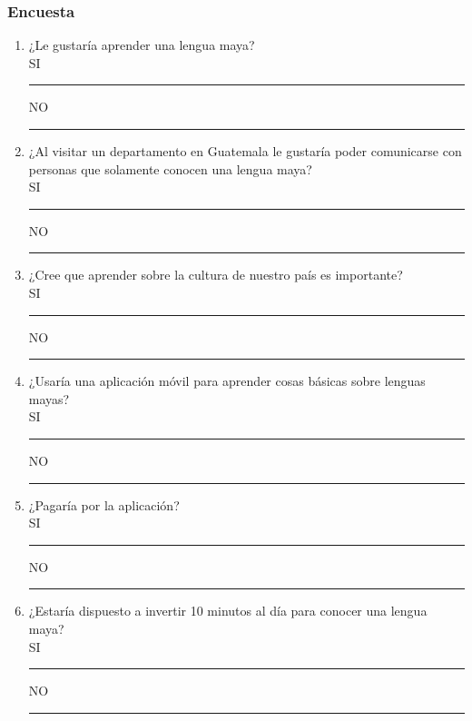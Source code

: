 \documentclass[a4paper,openright,11pt]{article}
\begin{document}
\subsubsection{Encuesta}
\begin{enumerate}
	\item ¿Le gustaría aprender una lengua maya?\\
	SI \rule{10mm}{0.1mm}  \hspace{5cm} NO \rule{10mm}{0.1mm}
	\item ¿Al visitar un departamento en Guatemala le gustaría poder comunicarse con personas que solamente conocen una lengua maya?	\\
	SI \rule{10mm}{0.1mm}  \hspace{5cm} NO \rule{10mm}{0.1mm}
	\item ¿Cree que aprender sobre la cultura de nuestro país es importante?\\
	SI \rule{10mm}{0.1mm}  \hspace{5cm} NO \rule{10mm}{0.1mm}
	\item ¿Usaría una aplicación móvil para aprender cosas básicas sobre lenguas mayas?\\
	SI \rule{10mm}{0.1mm}  \hspace{5cm} NO \rule{10mm}{0.1mm}
	\item ¿Pagaría por la aplicación?\\
	SI \rule{10mm}{0.1mm}  \hspace{5cm} NO \rule{10mm}{0.1mm}
	\item ¿Estaría dispuesto a invertir 10 minutos al día para conocer una lengua maya?\\
	SI \rule{10mm}{0.1mm}  \hspace{5cm} NO \rule{10mm}{0.1mm}
	
\end{enumerate}
\end{document}
